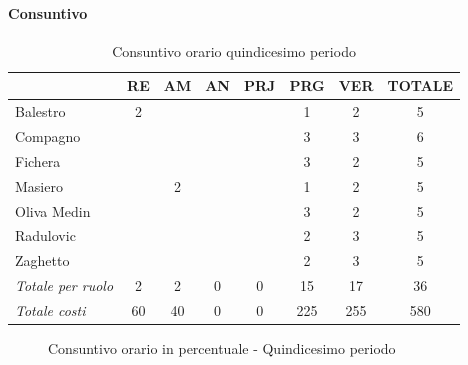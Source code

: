 \documentclass[a4paper,12pt]{article}
\begin{document}
            \paragraph{Consuntivo}
                \begin{table}[H]
                \centering
                \caption{Consuntivo orario quindicesimo periodo}
                \begin{tabular}{|l|c|c|c|c|c|c|c|}
                \hline
                    \rowcolor{lightgray}{\textbf{Membro}} & {\textbf{RE}} & {\textbf{AM}} & {\textbf{AN}} & {\textbf{PRJ}} & {\textbf{PRG}} & {\textbf{VER}} & {\textbf{TOTALE}}\\
                \hline
                    Balestro & 2 & & & & 1 & 2 & 5\\
                \hline
                    Compagno & & & & & 3 & 3 & 6\\
                \hline
                    Fichera & & & & & 3 & 2 & 5\\
                \hline
                    Masiero & & 2 & & & 1 & 2 & 5\\
                \hline
                    Oliva Medin & & & & & 3 & 2 & 5\\
                \hline
                    Radulovic & & & & & 2 & 3 & 5\\
                \hline
                    Zaghetto & & & & & 2 & 3 & 5\\
                \hline
                    \rowcolor{lightgray}\textit{Totale per ruolo} & 2 & 2 & 0 & 0 & 15 & 17 & 36\\
                \hline
                    \rowcolor{lightgray}\textit{Totale costi} & 60 & 40 & 0 & 0 & 225 & 255 & 580\\
                \hline
                \end{tabular}
                \end{table}

                \begin{figure}[H]
                \centering
                \caption{Consuntivo orario in percentuale - Quindicesimo periodo}
                \end{figure}
                
\end{document}
